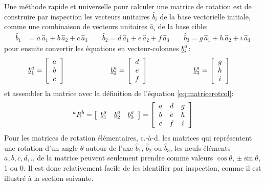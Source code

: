 Une méthode rapide et universelle pour calculer une matrice de rotation est de construire par inspection les vecteurs unitaires $\hat{b}_i$ de la base vectorielle initiale, comme une combinaison de vecteurs unitaires $\hat{a}_i$ de la base cible:
\begin{align}
	\hat{b}_1 &= a \, \hat{a}_1 + b \, \hat{a}_2 + c \, \hat{a}_3  \quad\quad  \hat{b}_2 = d \, \hat{a}_1 + e \, \hat{a}_2 + f \, \hat{a}_3   \quad\quad  \hat{b}_3 = g \, \hat{a}_1 + h \, \hat{a}_2 + i \, \hat{a}_3
\end{align}
pour ensuite convertir les équations en vecteur-colonnes $\underline{b}_i^a$:
\begin{align}
	\underline{b}_1^a  &= \left[ \begin{array}{c} a \\ b \\ c  \end{array} \right] \quad\quad\quad\quad\quad\quad\;
	\underline{b}_2^a  = \left[ \begin{array}{c} d \\ e \\ f  \end{array} \right]  \quad\quad\quad\quad\quad\quad\;
	\underline{b}_3^a  = \left[ \begin{array}{c} g \\ h \\ i  \end{array} \right]
\end{align}
et assembler la matrice avec la définition de l'équation \eqref{eq:matricerotcol}:
\begin{align}
{}^aR^b =
\left[ \begin{array}{c c c}
		   \underline{b}_1^a &  \underline{b}_2^a & \underline{b}_3^a
\end{array} \right]
=
\left[ \begin{array}{c c c}
		   a & d & g \\
		   b & e & h \\
		   c & f & i
\end{array} \right]
\end{align}
Pour les matrices de rotation élémentaires, c.-à-d. les matrices qui représentent une rotation d'un angle $\theta$ autour de l'axe $\hat{b}_1$, $\hat{b}_2$ ou $\hat{b}_3$, les neufs éléments $a,b,c,d,..$ de la matrice peuvent seulement prendre comme valeurs $\cos \theta$, $\pm \sin \theta$, $1$ ou $0$. Il est donc relativement facile de les identifier par inspection, comme il est illustré à la section suivante.


